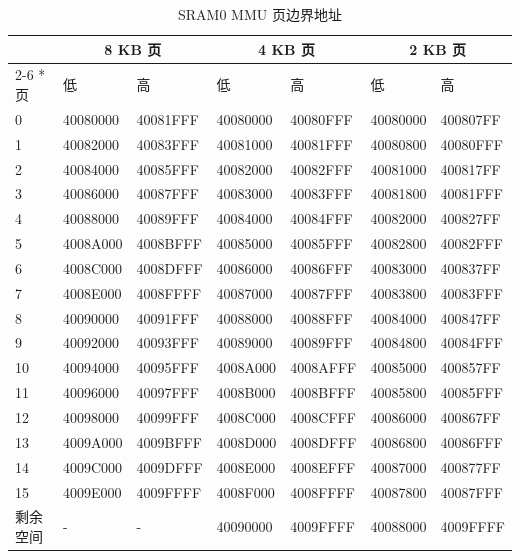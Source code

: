 \begin{table}[H]
    \centering
    \caption{SRAM0 MMU 页边界地址}
    \label{table:Page_Boundaries_SRAM0_MMU}
    
    
      \begin{tabular}[h]{ |p{1.5cm}|p{2cm}|p{2cm}|p{2cm}|p{2cm}|p{2cm}|p{2cm}|}
    
        \hline
        \rowcolor{lightgray}
        & \multicolumn{2}{c|}{8 KB 页} & \multicolumn{2}{c|}{4 KB 页} & \multicolumn{2}{c|}{2 KB 页} \\
        \cline{2-6}
        \rowcolor{lightgray}
        \multirow{-2}*{页} & 低 & 高 & 低 & 高 & 低 & 高 \\
        \hline
 	0 & 40080000 & 40081FFF & 40080000 & 40080FFF & 40080000 & 400807FF \\ \hline
	1 & 40082000 & 40083FFF & 40081000 & 40081FFF & 40080800 & 40080FFF \\ \hline
	2 & 40084000 & 40085FFF & 40082000 & 40082FFF & 40081000 & 400817FF \\ \hline
	3 & 40086000 & 40087FFF & 40083000 & 40083FFF & 40081800 & 40081FFF \\ \hline
	4 & 40088000 & 40089FFF & 40084000 & 40084FFF & 40082000 & 400827FF \\ \hline
	5 & 4008A000 & 4008BFFF & 40085000 & 40085FFF & 40082800 & 40082FFF \\ \hline
	6 & 4008C000 & 4008DFFF & 40086000 & 40086FFF & 40083000 & 400837FF \\ \hline
	7 & 4008E000 & 4008FFFF & 40087000 & 40087FFF & 40083800 & 40083FFF \\ \hline
	8 & 40090000 & 40091FFF & 40088000 & 40088FFF & 40084000 & 400847FF \\ \hline
	9 & 40092000 & 40093FFF & 40089000 & 40089FFF & 40084800 & 40084FFF \\ \hline
	10 & 40094000 & 40095FFF & 4008A000 & 4008AFFF & 40085000 & 400857FF \\ \hline
	11 & 40096000 & 40097FFF & 4008B000 & 4008BFFF & 40085800 & 40085FFF \\ \hline
	12 & 40098000 & 40099FFF & 4008C000 & 4008CFFF & 40086000 & 400867FF \\ \hline
	13 & 4009A000 & 4009BFFF & 4008D000 & 4008DFFF & 40086800 & 40086FFF \\ \hline
	14 & 4009C000 & 4009DFFF & 4008E000 & 4008EFFF & 40087000 & 400877FF \\ \hline
	15 & 4009E000 & 4009FFFF & 4008F000 & 4008FFFF & 40087800 & 40087FFF \\ \hline
	剩余空间 & - & - & 40090000 & 4009FFFF & 40088000 & 4009FFFF \\ \hline
    \end{tabular}
\end{table}


